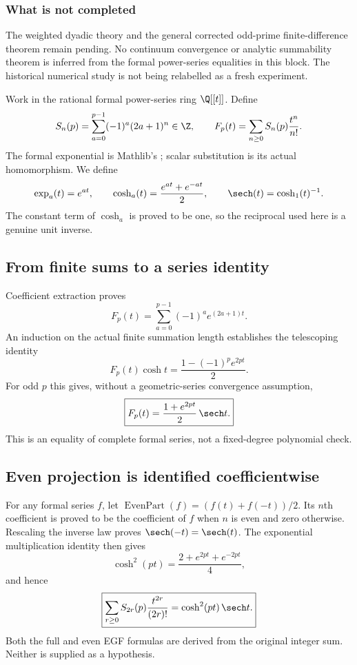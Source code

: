 \subsubsection*{What is not completed}
The weighted dyadic theory and the general corrected odd-prime finite-difference theorem remain pending. No continuum convergence or analytic summability theorem is inferred from the formal power-series equalities in this block. The historical numerical study is not being relabelled as a fresh experiment.
\par\medskip
{}
Work in the rational formal power-series ring $\Q[[t]]$. Define
\[
 S_n(p)=\sum_{a=0}^{p-1}(-1)^a(2a+1)^n\in\Z,
 \qquad F_p(t)=\sum_{n\ge0}S_n(p)\frac{t^n}{n!}.
\]
The formal exponential is Mathlib's ; scalar substitution is its actual  homomorphism. We define
\[
 \exp_a(t)=e^{at},\qquad
 \cosh_a(t)=\frac{e^{at}+e^{-at}}2,\qquad
 \sech(t)=\cosh_1(t)^{-1}.
\]
The constant term of $\cosh_a$ is proved to be one, so the reciprocal used here is a genuine unit inverse.

\subsection*{From finite sums to a series identity}
Coefficient extraction proves
\[
 F_p(t)=\sum_{a=0}^{p-1}(-1)^a e^{(2a+1)t}.
\]
An induction on the actual finite summation length establishes the telescoping identity
\[
 F_p(t)\cosh t=\frac{1-(-1)^p e^{2pt}}2.
\]
For odd $p$ this gives, without a geometric-series convergence assumption,
\[
 \boxed{F_p(t)=\frac{1+e^{2pt}}2\,\sech t.}
\]
This is an equality of complete formal series, not a fixed-degree polynomial check.

\subsection*{Even projection is identified coefficientwise}
For any formal series $f$, let $\operatorname{EvenPart}(f)=(f(t)+f(-t))/2$. Its $n$th coefficient is proved to be the coefficient of $f$ when $n$ is even and zero otherwise. Rescaling the inverse law proves $\sech(-t)=\sech(t)$. The exponential multiplication identity then gives
\[
 \cosh^2(pt)=\frac{2+e^{2pt}+e^{-2pt}}4,
\]
and hence
\[
 \boxed{\sum_{r\ge0}S_{2r}(p)\frac{t^{2r}}{(2r)!}
       =\cosh^2(pt)\,\sech t.}
\]
Both the full and even EGF formulas are derived from the original integer sum. Neither is supplied as a hypothesis.


